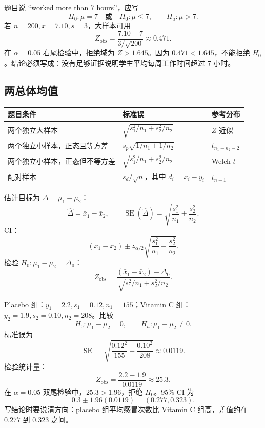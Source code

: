 \documentclass[11pt,a4paper]{article}
\newcommand{\SE}{\operatorname{SE}}
\begin{document}
\begin{methodbox}
题目说 “worked more than 7 hours”，应写
\[
  H_0:\mu=7
  \quad\text{或}\quad
  H_0:\mu\le 7,
  \qquad
  H_a:\mu>7.
\]
若 $n=200,\bar x=7.10,s=3$，大样本可用
\[
  Z_{\mathrm{obs}}
  =
  \frac{7.10-7}{3/\sqrt{200}}
  \approx 0.471.
\]
在 $\alpha=0.05$ 右尾检验中，拒绝域为 $Z>1.645$。因为 $0.471<1.645$，不能拒绝 $H_0$。结论必须写成：没有足够证据说明学生平均每周工作时间超过 7 小时。
\end{methodbox}

\subsection{两总体均值}

\begin{methodbox}[先判断题型]
\begin{center}
\begin{tabular}{lll}
\toprule
题目条件 & 标准误 & 参考分布\\
\midrule
两个独立大样本 & $\sqrt{s_1^2/n_1+s_2^2/n_2}$ & $Z$ 近似\\
两个独立小样本，正态且等方差 & $s_p\sqrt{1/n_1+1/n_2}$ & $t_{n_1+n_2-2}$\\
两个独立小样本，正态但不等方差 & $\sqrt{s_1^2/n_1+s_2^2/n_2}$ & Welch $t$\\
配对样本 & $s_d/\sqrt n$，其中 $d_i=x_i-y_i$ & $t_{n-1}$\\
\bottomrule
\end{tabular}
\end{center}
\end{methodbox}

\begin{templatebox}[两个独立大样本]
估计目标为 $\Delta=\mu_1-\mu_2$：
\[
  \hat\Delta=\bar x_1-\bar x_2,
  \qquad
  \SE(\hat\Delta)=\sqrt{\frac{s_1^2}{n_1}+\frac{s_2^2}{n_2}}.
\]
CI：
\[
  \boxed{
  (\bar x_1-\bar x_2)
  \pm
  z_{\alpha/2}
  \sqrt{\frac{s_1^2}{n_1}+\frac{s_2^2}{n_2}}
  }.
\]
检验 $H_0:\mu_1-\mu_2=\Delta_0$：
\[
  Z_{\mathrm{obs}}
  =
  \frac{(\bar x_1-\bar x_2)-\Delta_0}
  {\sqrt{s_1^2/n_1+s_2^2/n_2}}.
\]
\end{templatebox}

\begin{examplebox}
Placebo 组：$\bar y_1=2.2,s_1=0.12,n_1=155$；Vitamin C 组：
$\bar y_2=1.9,s_2=0.10,n_2=208$。比较
\[
  H_0:\mu_1-\mu_2=0,
  \qquad
  H_a:\mu_1-\mu_2\ne0.
\]
标准误为
\[
  \SE
  =
  \sqrt{\frac{0.12^2}{155}+\frac{0.10^2}{208}}
  \approx0.0119.
\]
检验统计量：
\[
  Z_{\mathrm{obs}}
  =
  \frac{2.2-1.9}{0.0119}
  \approx25.3.
\]
在 $\alpha=0.05$ 双尾检验中，$25.3>1.96$，拒绝 $H_0$。95\% CI 为
\[
  0.3\pm1.96(0.0119)
  =
  (0.277,0.323).
\]
写结论时要说清方向：placebo 组平均感冒次数比 Vitamin C 组高，差值约在 $0.277$ 到 $0.323$ 之间。
\end{examplebox}
\end{document}
